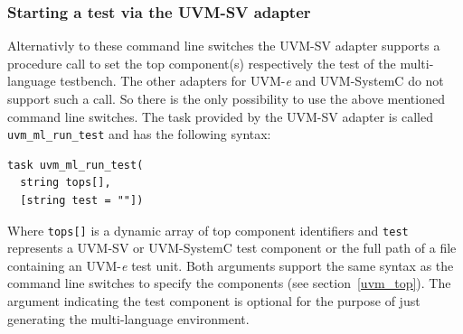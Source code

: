 \subsubsection{Starting a test via the UVM-SV adapter}

Alternativly to these command line switches the UVM-SV adapter supports a procedure call to set the top
component(s) respectively the test of the multi-language testbench. The other adapters for UVM-\textit{e} and
UVM-SystemC do not support such a call. So there is the only possibility to use the above mentioned command line
switches. The task provided by the UVM-SV adapter is called \lstinline$uvm_ml_run_test$ and has the following
syntax:
\medskip
{}
\begin{lstlisting}
task uvm_ml_run_test(
  string tops[],
  [string test = ""])
\end{lstlisting} 
\medskip
Where \lstinline$tops[]$ is a dynamic array of top component identifiers and \lstinline$test$ represents a
UVM-SV or UVM-SystemC test component or the full path of a file containing an UVM-\textit{e} test unit. Both arguments
support the same syntax as the command line switches to specify the components (see section~\ref{uvm_top}). The argument
indicating the test component is optional for the purpose of just generating the multi-language environment.